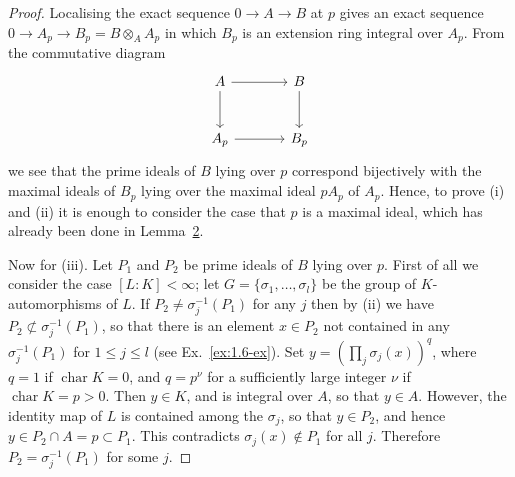 \begin{proof}
Localising the exact sequence $0 \to A \to B$ at $p$ gives an exact
sequence $0 \to A_p \to B_p = B \otimes_A A_p$ in which $B_p$ is an extension ring
integral over $A_p$. From the commutative diagram
\[
  \begin{tikzcd}[column sep=large, row sep=large]
    A \arrow[r] \arrow[d] & B \arrow[d] \\
    A_p \arrow[r] & B_p
  \end{tikzcd}
\]
we see that the prime ideals of $B$ lying over $p$ correspond bijectively with the
maximal ideals of $B_p$ lying over the maximal ideal $pA_p$ of $A_p$. Hence, to prove
(i) and (ii) it is enough to consider the case that $p$ is a maximal ideal, which
has already been done in Lemma~\hyperref[lem:9.2]{2}.

Now for (iii). Let $P_1$ and $P_2$ be prime ideals of $B$ lying over $p$. First of all
we consider the case $[L:K] < \infty$; let $G = \{\sigma_1, \ldots, \sigma_l\}$ be the group of $K$-
automorphisms of $L$. If $P_2 \neq \sigma_j^{-1}(P_1)$ for any $j$ then by (ii) we have
$P_2 \not\subset \sigma_j^{-1}(P_1)$, so that there is an element $x \in P_2$ not contained in any
$\sigma_j^{-1}(P_1)$ for $1 \le j \le l$ (see Ex.~\ref{ex:1.6-ex}). Set $y = (\prod_j \sigma_j(x))^q$, where $q = 1$ if $\operatorname{char}
K = 0$, and $q = p^\nu$ for a sufficiently large integer $\nu$ if $\operatorname{char} K = p > 0$. Then
$y \in K$, and is integral over $A$, so that $y \in A$. However, the identity map of $L$ is
contained among the $\sigma_j$, so that $y \in P_2$, and hence $y \in P_2 \cap A = p \subset P_1$. This
contradicts $\sigma_j(x) \notin P_1$ for all $j$. Therefore $P_2 = \sigma_j^{-1}(P_1)$ for some $j$.


\end{proof}
